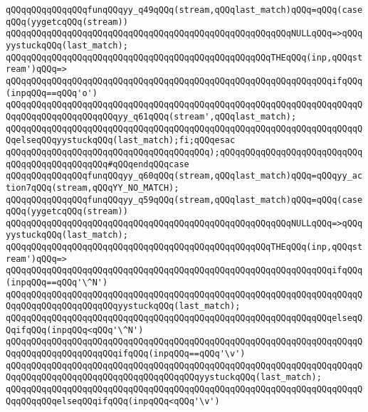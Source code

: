 \verb|qQQqqQQqqQQqqQQqfunqQQqyy_q49qQQq(stream,qQQqlast_match)qQQq=qQQq(caseqQQq(yygetcqQQq(stream))|\newline
\verb|qQQqqQQqqQQqqQQqqQQqqQQqqQQqqQQqqQQqqQQqqQQqqQQqqQQqqQQqNULLqQQq=>qQQqyystuckqQQq(last_match);|\newline
\verb|qQQqqQQqqQQqqQQqqQQqqQQqqQQqqQQqqQQqqQQqqQQqqQQqqQQqTHEqQQq(inp,qQQqstream')qQQq=>|\newline
\verb|qQQqqQQqqQQqqQQqqQQqqQQqqQQqqQQqqQQqqQQqqQQqqQQqqQQqqQQqqQQqqQQqifqQQq(inpqQQq==qQQq'o')|\newline
\verb|qQQqqQQqqQQqqQQqqQQqqQQqqQQqqQQqqQQqqQQqqQQqqQQqqQQqqQQqqQQqqQQqqQQqqQQqqQQqqQQqqQQqqQQqqQQqyy_q61qQQq(stream',qQQqlast_match);|\newline
\verb|qQQqqQQqqQQqqQQqqQQqqQQqqQQqqQQqqQQqqQQqqQQqqQQqqQQqqQQqqQQqqQQqqQQqqQQqelseqQQqyystuckqQQq(last_match);fi;qQQqesac|\newline
\verb|qQQqqQQqqQQqqQQqqQQqqQQqqQQqqQQqqQQqqQQq);qQQqqQQqqQQqqQQqqQQqqQQqqQQqqQQqqQQqqQQqqQQqqQQq#qQQqendqQQqcase|\newline
\verb|qQQqqQQqqQQqqQQqfunqQQqyy_q60qQQq(stream,qQQqlast_match)qQQq=qQQqyy_action7qQQq(stream,qQQqYY_NO_MATCH);|\newline
\verb|qQQqqQQqqQQqqQQqfunqQQqyy_q59qQQq(stream,qQQqlast_match)qQQq=qQQq(caseqQQq(yygetcqQQq(stream))|\newline
\verb|qQQqqQQqqQQqqQQqqQQqqQQqqQQqqQQqqQQqqQQqqQQqqQQqqQQqqQQqNULLqQQq=>qQQqyystuckqQQq(last_match);|\newline
\verb|qQQqqQQqqQQqqQQqqQQqqQQqqQQqqQQqqQQqqQQqqQQqqQQqqQQqTHEqQQq(inp,qQQqstream')qQQq=>|\newline
\verb|qQQqqQQqqQQqqQQqqQQqqQQqqQQqqQQqqQQqqQQqqQQqqQQqqQQqqQQqqQQqqQQqifqQQq(inpqQQq==qQQq'\^N')|\newline
\verb|qQQqqQQqqQQqqQQqqQQqqQQqqQQqqQQqqQQqqQQqqQQqqQQqqQQqqQQqqQQqqQQqqQQqqQQqqQQqqQQqqQQqqQQqqQQqyystuckqQQq(last_match);|\newline
\verb|qQQqqQQqqQQqqQQqqQQqqQQqqQQqqQQqqQQqqQQqqQQqqQQqqQQqqQQqqQQqqQQqelseqQQqifqQQq(inpqQQq<qQQq'\^N')|\newline
\verb|qQQqqQQqqQQqqQQqqQQqqQQqqQQqqQQqqQQqqQQqqQQqqQQqqQQqqQQqqQQqqQQqqQQqqQQqqQQqqQQqqQQqqQQqqQQqifqQQq(inpqQQq==qQQq'\v')|\newline
\verb|qQQqqQQqqQQqqQQqqQQqqQQqqQQqqQQqqQQqqQQqqQQqqQQqqQQqqQQqqQQqqQQqqQQqqQQqqQQqqQQqqQQqqQQqqQQqqQQqqQQqqQQqqQQqyystuckqQQq(last_match);|\newline
\verb|qQQqqQQqqQQqqQQqqQQqqQQqqQQqqQQqqQQqqQQqqQQqqQQqqQQqqQQqqQQqqQQqqQQqqQQqqQQqqQQqelseqQQqifqQQq(inpqQQq<qQQq'\v')|\newline
